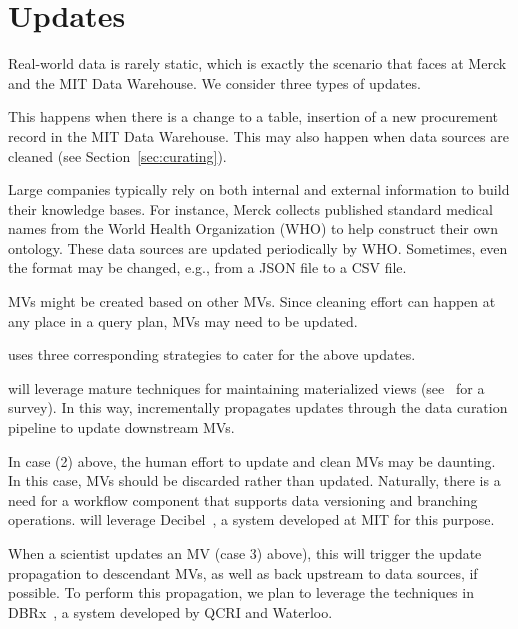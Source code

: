 \section{Updates}
\label{sec:updates}

Real-world data is rarely static, which is exactly the scenario that \dcv faces at Merck and the MIT Data Warehouse.  We consider three types of updates.

 This happens when there is a change to a table, \eg insertion of a new procurement record in the MIT Data Warehouse. This may also happen when data sources are cleaned (see Section~\ref{sec:curating}).


 Large companies typically rely on both internal and external information to build their knowledge bases. For instance, Merck collects published standard medical names from the World Health Organization (WHO) to help construct their own ontology. These data sources are updated periodically by WHO.  Sometimes, even the format may be changed, e.g., from a JSON file to a CSV file.


 MVs might be created based on other MVs.  Since cleaning effort can happen at any place in a query plan, MVs may need to be updated.


\dcv uses three corresponding strategies to cater for the above updates.


 \dcv will leverage mature techniques for maintaining materialized views (see~\cite{DBLP:journals/debu/GuptaM95} for a survey).  In this way, \dcv incrementally propagates updates through the data curation pipeline to update downstream MVs.




  In case (2) above, the human effort to update and clean MVs may be daunting. In this case, MVs should be discarded rather than updated. Naturally, there is a need for a workflow component that supports data versioning and branching operations. \dcv will leverage Decibel~\cite{DBLP:journals/pvldb/MaddoxGEMPD16}, a system developed at MIT for this purpose.

 When a scientist updates an MV (case 3) above), this will trigger the update propagation to descendant MVs, as well as back upstream to data sources, if possible. To perform this propagation, we plan to leverage the techniques in DBRx~\cite{DBLP:conf/sigmod/ChalamallaIOP14}, a system developed by QCRI and Waterloo.




